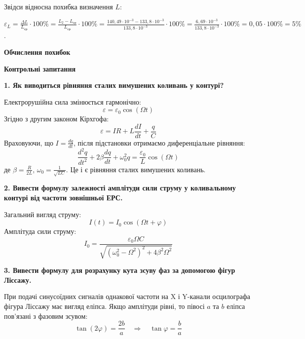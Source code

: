 \documentclass[12pt,a4paper]{article}
\begin{document}
    \vspace{1em}

    Звідси відносна похибка визначення $L$:

    $\displaystyle \varepsilon_L = \frac{\Delta L}{L_{\text{ср}}} \cdot 100\%
    = \frac{L_2 - L_{\text{ср}}}{L_{\text{ср}}} \cdot 100\%
    = \frac{140,49 \cdot 10^{-3} - 133,8 \cdot 10^{-3}}{133,8 \cdot 10^{-3}} \cdot 100\%
    = \frac{6,69 \cdot 10^{-3}}{133,8 \cdot 10^{-3}} \cdot 100\% = 0,05 \cdot 100\% = 5\%$.

    \newpage

    \begin{center}\textbf{\large Обчислення похибок}\end{center}

    \newpage

    \begin{center}
        \textbf{\Large Контрольні запитання}
    \end{center}

    \setlength{\parindent}{0pt}

    \textbf{1. Як виводиться рівняння сталих вимушених коливань у контурі?}

    Електрорушійна сила змінюється гармонічно:
    \[
    \varepsilon = \varepsilon_0 \cos(\Omega t)
    \]
    Згідно з другим законом Кірхгофа:
    \[
    \varepsilon = IR + L\frac{dI}{dt} + \frac{q}{C}
    \]
    Враховуючи, що $\displaystyle I = \frac{dq}{dt}$, після підстановки отримаємо диференціальне рівняння:
    \[
    \frac{d^2q}{dt^2} + 2\beta \frac{dq}{dt} + \omega_0^2 q = \frac{\varepsilon_0}{L} \cos(\Omega t)
    \]
    де $\displaystyle \beta = \frac{R}{2L}$, $\displaystyle \omega_0 = \frac{1}{\sqrt{LC}}$. Це і є рівняння сталих вимушених коливань.

    \vspace{1em}

    \textbf{2. Вивести формулу залежності амплітуди сили струму у коливальному контурі від частоти зовнішньої ЕРС.}

    Загальний вигляд струму:
    \[
    I(t) = I_0 \cos(\Omega t + \varphi)
    \]
    Амплітуда сили струму:
    \[
    I_0 = \frac{\varepsilon_0 \Omega C}{\sqrt{(\omega_0^2 - \Omega^2)^2 + 4\beta^2 \Omega^2}}
    \]

    \vspace{1em}

    \textbf{3. Вивести формулу для розрахунку кута зсуву фаз за допомогою фігур Ліссажу.}

    При подачі синусоїдних сигналів однакової частоти на X і Y-канали осцилографа фігура Ліссажу має вигляд еліпса. Якщо амплітуди рівні, то півосі \( a \) та \( b \) еліпса пов’язані з фазовим зсувом:
    \[
    \tan(2\varphi) = \frac{2b}{a} \quad \Rightarrow \quad \tan\varphi = \frac{b}{a}
    \]
\end{document}
